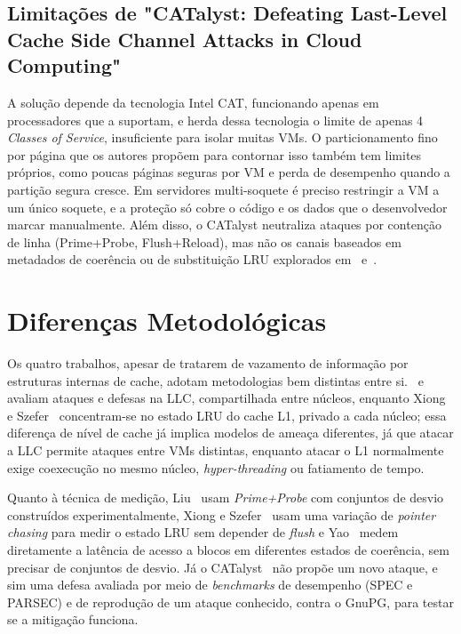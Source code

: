 \documentclass[12pt]{article}
\begin{document}
\subsection{Limitações de "CATalyst: Defeating Last-Level Cache Side Channel Attacks in Cloud Computing"~\cite{7446082}}

A solução depende da tecnologia Intel CAT, funcionando apenas em processadores que a suportam, e herda dessa tecnologia o limite de apenas 4 \textit{Classes of Service}, insuficiente para isolar muitas VMs. O particionamento fino por página que os autores propõem para contornar isso também tem limites próprios, como poucas páginas seguras por VM e perda de desempenho quando a partição segura cresce. Em servidores multi-soquete é preciso restringir a VM a um único soquete, e a proteção só cobre o código e os dados que o desenvolvedor marcar manualmente. Além disso, o CATalyst neutraliza ataques por contenção de linha (Prime+Probe, Flush+Reload), mas não os canais baseados em metadados de coerência ou de substituição LRU explorados em~\cite{8327007} e~\cite{9065598}.

\section{Diferenças Metodológicas}

Os quatro trabalhos, apesar de tratarem de vazamento de informação por estruturas internas de cache, adotam metodologias bem distintas entre si.~\cite{7163050} e ~\cite{7446082} avaliam ataques e defesas na LLC, compartilhada entre núcleos, enquanto Xiong e Szefer~\cite{9065598} concentram-se no estado LRU do cache L1, privado a cada núcleo; essa diferença de nível de cache já implica modelos de ameaça diferentes, já que atacar a LLC permite ataques entre VMs distintas, enquanto atacar o L1 normalmente exige coexecução no mesmo núcleo, \textit{hyper-threading} ou fatiamento de tempo.

Quanto à técnica de medição, Liu~\cite{7163050} usam \textit{Prime+Probe} com conjuntos de desvio construídos experimentalmente, Xiong e Szefer~\cite{9065598} usam uma variação de \textit{pointer chasing} para medir o estado LRU sem depender de \textit{flush} e Yao~\cite{8327007} medem diretamente a latência de acesso a blocos em diferentes estados de coerência, sem precisar de conjuntos de desvio. Já o CATalyst~\cite{7446082} não propõe um novo ataque, e sim uma defesa avaliada por meio de \textit{benchmarks} de desempenho (SPEC e PARSEC) e de reprodução de um ataque conhecido, contra o GnuPG, para testar se a mitigação funciona.
\end{document}
